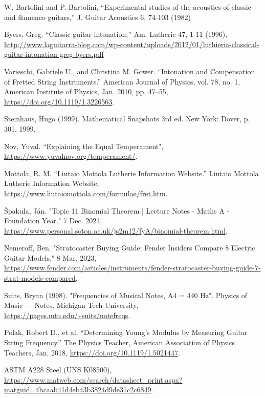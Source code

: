 \begin{thebibliography}{15}
    \scriptsize
     W. Bartolini and P. Bartolini, “Experimental studies of the acoustics of classic and flamenco guitars,” J. Guitar Acoustics 6, 74-103 (1982)

     Byers, Greg. “Classic guitar intonation,” Am. Lutherie 47, 1-11 (1996), \url{http://www.laguitarra-blog.com/wp-content/uploads/2012/01/luthieria-classical-guitar-intonation-greg-byers.pdf}
    
     Varieschi, Gabriele U., and Christina M. Gower. “Intonation and Compensation of Fretted String Instruments.” American Journal of Physics, vol. 78, no. 1, American Institute of Physics, Jan. 2010, pp. 47–55, \url{https://doi.org/10.1119/1.3226563}.

     Steinhaus, Hugo (1999). Mathematical Snapshots 3rd ed. New York: Dover, p. 301, 1999.
    
     Nov, Yuval. “Explaining the Equal Temperament", \url{https://www.yuvalnov.org/temperament/}.

     Mottola, R. M. “Liutaio Mottola Lutherie Information Website.” Liutaio Mottola Lutherie Information Website, \url{https://www.liutaiomottola.com/formulae/fret.htm}.

     Špakula, Ján. "Topic 11 Binomial Theorem | Lecture Notes - Maths A - Foundation Year." 7 Dec. 2021, \url{https://www.personal.soton.ac.uk/js2m12/fyA/binomial-theorem.html}.

     Nemeroff, Ben. "Stratocaster Buying Guide: Fender Insiders Compare 8 Electric Guitar Models." 8 Mar. 2023, \url{https://www.fender.com/articles/instruments/fender-stratocaster-buying-guide-7-strat-models-compared}.

     Suits, Bryan (1998). "Frequencies of Musical Notes, A4 = 440 Hz". Physics of Music — Notes. Michigan Tech University, \url{https://pages.mtu.edu/~suits/notefreqs}.
    
     Polak, Robert D., et al. “Determining Young’s Modulus by Measuring Guitar String Frequency.” The Physics Teacher, American Association of Physics Teachers, Jan. 2018, \url{https://doi.org/10.1119/1.5021447}.

     ASTM A228 Steel (UNS K08500), \url{https://www.matweb.com/search/datasheet_print.aspx?matguid=4bcaab41d4eb43b3824d9de31c2c6849}.


\end{thebibliography}
